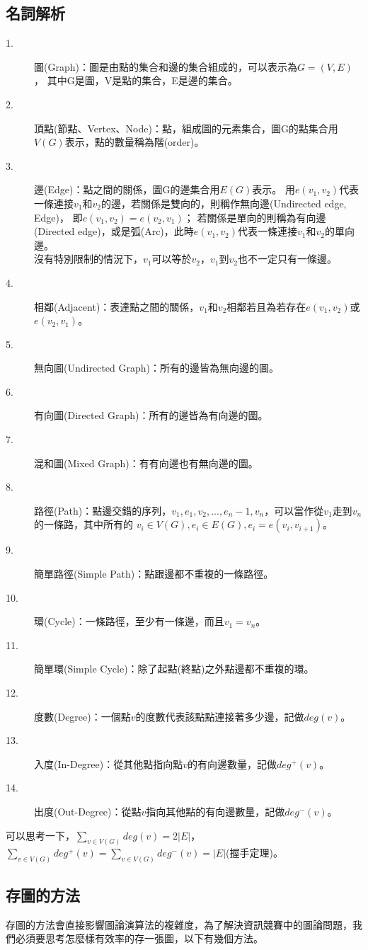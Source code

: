 \documentclass{article}
\begin{document}
\subsection{名詞解析}
\begin{description}
\item[ 1.]圖(Graph)：圖是由點的集合和邊的集合組成的，可以表示為$G = (V,E)$，
其中G是圖，V是點的集合，E是邊的集合。
\item[ 2.]頂點(節點、Vertex、Node)：點，組成圖的元素集合，圖G的點集合用$V(G)$表示，點的數量稱為階(order)。
\item[ 3.]邊(Edge)：點之間的關係，圖G的邊集合用$E(G)$表示。
用$e(v_1,v_2)$代表一條連接$v_1$和$v_2$的邊，若關係是雙向的，則稱作無向邊(Undirected edge, Edge)，
即$e(v_1,v_2) = e(v_2,v_1)$；
若關係是單向的則稱為有向邊(Directed edge)，或是弧(Arc)，此時$e(v_1,v_2)$代表一條連接$v_1$和$v_2$的單向邊。\\
沒有特別限制的情況下，$v_1$可以等於$v_2$，$v_1$到$v_2$也不一定只有一條邊。
\item[ 4.]相鄰(Adjacent)：表達點之間的關係，$v_1$和$v_2$相鄰若且為若存在$e(v_1,v_2)$或$e(v_2,v_1)$。
\item[ 5.]無向圖(Undirected Graph)：所有的邊皆為無向邊的圖。
\item[ 6.]有向圖(Directed Graph)：所有的邊皆為有向邊的圖。
\item[ 7.]混和圖(Mixed Graph)：有有向邊也有無向邊的圖。
\item[ 8.]路徑(Path)：點邊交錯的序列，$v_1,e_1,v_2,...,e_n-1,v_n$，可以當作從$v_1$走到$v_n$的一條路，其中所有的
$v_i \in V(G), e_i \in E(G), e_i = e(v_i, v_{i+1})$。
\item[ 9.]簡單路徑(Simple Path)：點跟邊都不重複的一條路徑。
\item[ 10.]環(Cycle)：一條路徑，至少有一條邊，而且$v_1 = v_n$。
\item[ 11.]簡單環(Simple Cycle)：除了起點(終點)之外點邊都不重複的環。
\item[ 12.]度數(Degree)：一個點$v$的度數代表該點點連接著多少邊，記做$deg(v)$。
\item[ 13.]入度(In-Degree)：從其他點指向點$v$的有向邊數量，記做$deg^+(v)$。
\item[ 14.]出度(Out-Degree)：從點$v$指向其他點的有向邊數量，記做$deg^-(v)$。
\end{description}
可以思考一下，$\sum_{v \in V(G)}deg(v) = 2|E|$，
$\sum_{v \in V(G)}deg^+(v) = \sum_{v \in V(G)}deg^-(v) = |E|$(握手定理)。

\subsection{存圖的方法}
存圖的方法會直接影響圖論演算法的複雜度，為了解決資訊競賽中的圖論問題，我們必須要思考怎麼樣有效率的存一張圖，以下有幾個方法。
\end{document}
